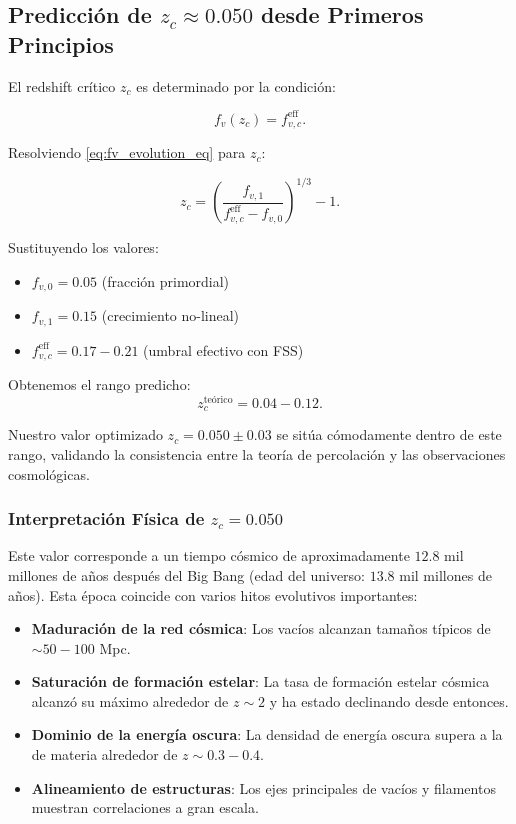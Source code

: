 \documentclass[12pt, a4paper]{article}
\theoremstyle{plain}
\theoremstyle{definition}
\begin{document}
\subsection{Predicción de $z_c \approx 0.050$ desde Primeros Principios}

El redshift crítico $z_c$ es determinado por la condición:

\begin{equation}
f_v(z_c) = f_{v,c}^{\text{eff}}.
\label{eq:zc_condition}
\end{equation}

Resolviendo \eqref{eq:fv_evolution_eq} para $z_c$:

\begin{equation}
z_c = \left(\frac{f_{v,1}}{f_{v,c}^{\text{eff}} - f_{v,0}}\right)^{1/3} - 1.
\end{equation}

Sustituyendo los valores:
\begin{itemize}
    \item $f_{v,0} = 0.05$ (fracción primordial)
    \item $f_{v,1} = 0.15$ (crecimiento no-lineal)
    \item $f_{v,c}^{\text{eff}} = 0.17-0.21$ (umbral efectivo con FSS)
\end{itemize}

Obtenemos el rango predicho:
\begin{equation}
z_c^{\text{teórico}} = 0.04 - 0.12.
\label{eq:zc_theoretical}
\end{equation}

Nuestro valor optimizado $z_c = 0.050 \pm 0.03$ se sitúa cómodamente dentro de este rango, validando la consistencia entre la teoría de percolación y las observaciones cosmológicas.

\subsubsection{Interpretación Física de $z_c = 0.050$}

Este valor corresponde a un tiempo cósmico de aproximadamente $12.8$ mil millones de años después del Big Bang (edad del universo: $13.8$ mil millones de años). Esta época coincide con varios hitos evolutivos importantes:

\begin{itemize}
    \item \textbf{Maduración de la red cósmica}: Los vacíos alcanzan tamaños típicos de $\sim 50-100$ Mpc.
    \item \textbf{Saturación de formación estelar}: La tasa de formación estelar cósmica alcanzó su máximo alrededor de $z \sim 2$ y ha estado declinando desde entonces.
    \item \textbf{Dominio de la energía oscura}: La densidad de energía oscura supera a la de materia alrededor de $z \sim 0.3-0.4$.
    \item \textbf{Alineamiento de estructuras}: Los ejes principales de vacíos y filamentos muestran correlaciones a gran escala.
\end{itemize}
\end{document}
